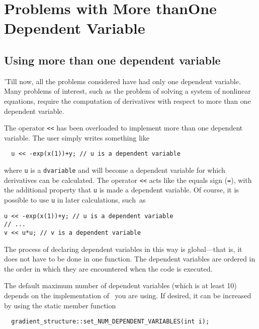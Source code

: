 \documentclass{admbmanual}
\begin{document}

\chapter{Problems with More than\br One Dependent Variable}
\label{ch:problems-more-dependent-variable}


\section{Using more than one dependent variable}

'Till now, all the problems considered have had only one dependent 
variable. Many problems of interest, such as the problem of
solving a system of nonlinear equations, require the computation
of derivatives with respect to more than one dependent variable.  

The operator \texttt{<{}<} has been overloaded to implement 
more than one dependent variable. The user simply writes
something like
\begin{lstlisting}
  u << -exp(x(1))+y; // u is a dependent variable
\end{lstlisting}
where \texttt{u} is a \texttt{dvariable} and will become a
dependent variable for which  derivatives can be calculated.
The operator \texttt{<{}<} acts like the equals sign (\texttt{=}), with the additional
property that \texttt{u} is made a dependent variable.
Of course, it is possible to use \texttt{u} in later calculations,
such~as
\begin{lstlisting}
u << -exp(x(1))+y; // u is a dependent variable
// ...
v << u*u; // v is a dependent variable
\end{lstlisting}

The process of declaring dependent variables in this way is
global---that is, it does not have to be done in one function.
The dependent variables are ordered in the order in which they
are encountered when the code is executed.

The default maximum number of dependent variables (which is at least 10)
depends on the implementation of \scAD\ you are using.
If desired, it can be increased by using the static member function
\begin{lstlisting}
  gradient_structure::set_NUM_DEPENDENT_VARIABLES(int i);
\end{lstlisting}
\end{document}
